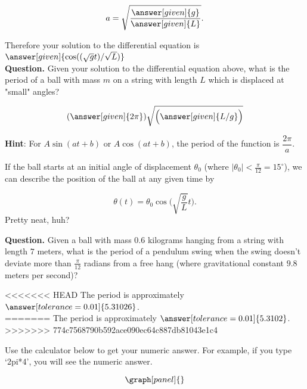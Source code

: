 \documentclass[handout,nooutcomes]{ximera}
\begin{document}
\begin{example}
\begin{explanation}
\[
a = \sqrt{\dfrac{\answer[given]{g}}{\answer[given]{L}}}.
\]


Therefore your solution to the differential equation is $\answer[given]{ \cos((\sqrt{g}t)/\sqrt{L})}$\\



\textbf{Question. } Given your solution to the differential equation above, what is the period of a ball with mass $m$ on a string with length $L$ which is displaced at "small" angles?

\[
(\answer[given]{2\pi})\sqrt{\Big(\answer[given]{L/g}\Big)}
\]
\medskip

\textbf{Hint}: For $A\sin(at+b)$ or $A\cos(at+b)$, the period of the 
function is $\dfrac{2\pi}{a}$.


If the ball starts at an initial angle of displacement $\theta_0$
(where $|\theta_0|<\frac{\pi}{12}= 15^\circ$), we can describe
the position of the ball at any given time by

\[
\theta(t) = \theta_0 \cos\Big(\sqrt{\frac{g}{L}} t\Big).
\]
Pretty neat, huh?


\textbf{Question. } Given a ball with mass $0.6$ kilograms hanging from a string with length $7$ meters, what is the period of a pendulum swing when the swing doesn't deviate more than $\frac{\pi}{12}$ radians from a free hang (where gravitational constant $9.8$ meters per second)?


<<<<<<< HEAD
The period is approximately $\answer[tolerance=0.01]{5.31026}$.\\
=======
The period is approximately $\answer[tolerance=0.01]{5.3102}$.\\
>>>>>>> 774c7568790b592ace090ec64c887db81043e1c4

Use the calculator below to get your numeric answer. For example, if you type
`2pi*4', you will see the numeric answer.

\[
\graph[panel]{}
\]


\end{explanation}
\end{example}
\end{document}
